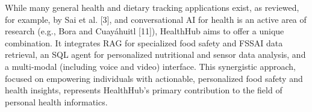 While many general health and dietary tracking applications exist, as reviewed, for example, by Sai et al. [3], and conversational AI for health is an active area of research (e.g., Bora and Cuayáhuitl [11]), HealthHub aims to offer a unique combination. It integrates RAG for specialized food safety and FSSAI data retrieval, an SQL agent for personalized nutritional and sensor data analysis, and a multi-modal (including voice and video) interface. This synergistic approach, focused on empowering individuals with actionable, personalized food safety and health insights, represents HealthHub's primary contribution to the field of personal health informatics. 